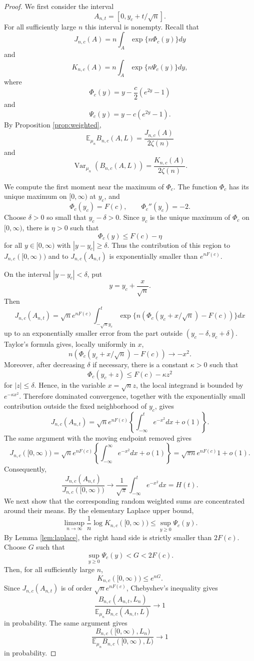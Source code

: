 \documentclass[a4paper,12pt]{article}
\theoremstyle{definition}
\theoremstyle{remark}
\newcommand{\ex}{\mathbb E}
\newcommand{\Var}{\operatorname{Var}}
\begin{document}
\begin{proof}
We first consider the interval
$$
A_{n,t}=[0,y_c+t/\sqrt{n}].
$$
For all sufficiently large $n$ this interval is nonempty. Recall that
$$
J_{n,c}(A)=
n\int_A \exp\{n\Phi_c(y)\}dy
$$
and
$$
K_{n,c}(A)=
n\int_A \exp\{n\Psi_c(y)\}dy,
$$
where
$$
\Phi_c(y)=y-\frac{c}{2}(e^{2y}-1)
$$
and
$$
\Psi_c(y)=y-c(e^{2y}-1).
$$
By Proposition \ref{prop:weighted},
$$
\ex_{\mu_n}B_{n,c}(A,L)=\frac{J_{n,c}(A)}{2\zeta(n)}
$$
and
$$
\Var_{\mu_n}(B_{n,c}(A,L))
=
\frac{K_{n,c}(A)}{2\zeta(n)}.
$$

We compute the first moment near the maximum of $\Phi_c$.
The function $\Phi_c$ has its unique maximum on $[0,\infty)$ at $y_c$,
and
$$
\Phi_c(y_c)=F(c),\qquad \Phi_c''(y_c)=-2.
$$
Choose $\delta>0$ so small that $y_c-\delta>0$.
Since $y_c$ is the unique maximum of $\Phi_c$ on $[0,\infty)$, there is
$\eta>0$ such that
$$
\Phi_c(y)\le F(c)-\eta
$$
for all $y\in[0,\infty)$ with $|y-y_c|\ge\delta$.
Thus the contribution of this region to $J_{n,c}([0,\infty))$ and to
$J_{n,c}(A_{n,t})$ is exponentially smaller than $e^{nF(c)}$.

On the interval $|y-y_c|<\delta$, put
$$
y=y_c+\frac{x}{\sqrt{n}}.
$$
Then
$$
J_{n,c}(A_{n,t})
=
\sqrt{n}e^{nF(c)}
\int_{-\sqrt{n}y_c}^{t}
\exp\{n(\Phi_c(y_c+x/\sqrt{n})-F(c))\}dx
$$
up to an exponentially smaller error from the part outside
$(y_c-\delta,y_c+\delta)$.
Taylor's formula gives, locally uniformly in $x$,
$$
n(\Phi_c(y_c+x/\sqrt{n})-F(c))\longrightarrow -x^2 .
$$
Moreover, after decreasing $\delta$ if necessary, there is a constant
$\kappa>0$ such that
$$
\Phi_c(y_c+z)\le F(c)-\kappa z^2
$$
for $|z|\le\delta$.
Hence, in the variable $x=\sqrt n z$, the local integrand is bounded by
$e^{-\kappa x^2}$.
Therefore dominated convergence, together with the exponentially small
contribution outside the fixed neighborhood of $y_c$, gives
$$
J_{n,c}(A_{n,t})
=
\sqrt{n}e^{nF(c)}
\left\{
\int_{-\infty}^{t}e^{-x^2}dx+o(1)
\right\}.
$$
The same argument with the moving endpoint removed gives
$$
J_{n,c}([0,\infty))
=
\sqrt{n}e^{nF(c)}
\left\{
\int_{-\infty}^{\infty}e^{-x^2}dx+o(1)
\right\}
=
\sqrt{\pi n}e^{nF(c)}{1+o(1)}.
$$
Consequently,
$$
\frac{J_{n,c}(A_{n,t})}{J_{n,c}([0,\infty))}
\longrightarrow
\frac{1}{\sqrt{\pi}}\int_{-\infty}^{t}e^{-x^2}dx
=H(t).
$$
%
We next show that the corresponding random weighted sums are concentrated
around their means. By the elementary Laplace upper bound,
$$
\limsup_{n\to\infty}
\frac{1}{n}\log K_{n,c}([0,\infty))
\le
\sup_{y\ge0}\Psi_c(y).
$$
By Lemma \ref{lem:laplace}, the right hand side is strictly smaller than
$2F(c)$. Choose $G$ such that
$$
\sup_{y\ge0}\Psi_c(y)<G<2F(c).
$$
Then, for all sufficiently large $n$,
$$
K_{n,c}([0,\infty))\le e^{nG}.
$$
Since $J_{n,c}(A_{n,t})$ is of order $\sqrt n e^{nF(c)}$, Chebyshev's
inequality gives
$$
\frac{
B_{n,c}(A_{n,t},L_n)
}{
\ex_{\mu_n}B_{n,c}(A_{n,t},L)
}
\longrightarrow 1
$$
in probability. The same argument gives
$$
\frac{
B_{n,c}([0,\infty),L_n)
}{
\ex_{\mu_n}B_{n,c}([0,\infty),L)
}
\longrightarrow 1
$$
in probability.


\end{proof}
\end{document}
